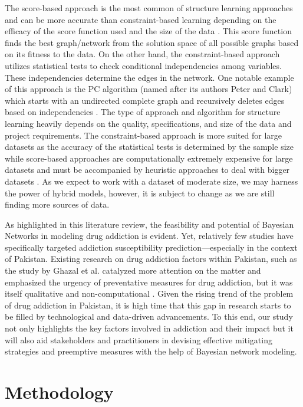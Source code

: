 \documentclass[conference]{IEEEtran}
\begin{document}
The score-based approach is the most common of structure learning approaches and can be more accurate than constraint-based learning depending on the efficacy of the score function used and the size of the data \cite{scanagatta2019survey}. This score function finds the best graph/network from the solution space of all possible graphs based on its fitness to the data. On the other hand, the constraint-based approach utilizes statistical tests to check conditional independencies among variables. These independencies determine the edges in the network. One notable example of this approach is the PC algorithm (named after its authors Peter and Clark) which starts with an undirected complete graph and recursively deletes edges based on independencies \cite{scanagatta2019survey}. The type of approach and algorithm for structure learning heavily depends on the quality, specifications, and size of the data and project requirements. The constraint-based approach is more suited for large datasets as the accuracy of the statistical tests is determined by the sample size while score-based approaches are computationally extremely expensive for large datasets and must be accompanied by heuristic approaches to deal with bigger datasets \cite{scanagatta2019survey}. As we expect to work with a dataset of moderate size, we may harness the power of hybrid models, however, it is subject to change as we are still finding more sources of data. 

As highlighted in this literature review, the feasibility and potential of Bayesian Networks in modeling drug addiction is evident. Yet, relatively few studies have specifically targeted addiction susceptibility prediction—especially in the context of Pakistan. Existing research on drug addiction factors within Pakistan, such as the study by Ghazal et al. catalyzed more attention on the matter and emphasized the urgency of preventative measures for drug addiction, but it was itself qualitative and non-computational \cite{ghazal_substance_abuse_pakistan}. Given the rising trend of the problem of drug addiction in Pakistan, it is high time that this gap in research starts to be filled by technological and data-driven advancements. To this end, our study not only highlights the key factors involved in addiction and their impact but it will also aid stakeholders and practitioners in devising effective mitigating strategies and preemptive measures with the help of Bayesian network modeling. 

\section{Methodology}
\end{document}
